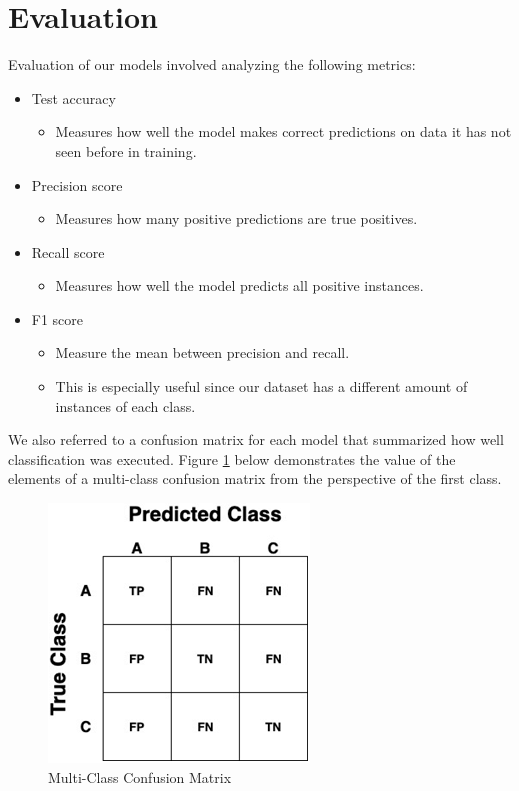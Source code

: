 \graphicspath{ {project_images/} }

\section{Evaluation}
Evaluation of our models involved analyzing the following metrics:

\begin{itemize}
	\item Test accuracy
	\begin{itemize}
		\item Measures how well the model makes correct predictions on data it has not seen before in training.
	\end{itemize}
	\item Precision score
	\begin{itemize}
		\item Measures how many positive predictions are true positives.
	\end{itemize}
	\item Recall score
	\begin{itemize}
		\item Measures how well the model predicts all positive instances.
	\end{itemize}
	\item F1 score
	\begin{itemize}
		\item Measure the mean between precision and recall.
		\item This is especially useful since our dataset has a different amount of instances of each class. 
	\end{itemize}
\end{itemize}

We also referred to a confusion matrix for each model that summarized how well classification was executed. Figure \ref{fig:figure3} below demonstrates the value of the elements of a multi-class confusion matrix from the perspective of the first class.

\begin{figure}[h]
	\centering
	\includegraphics[scale=0.4]{multiclass_cfm}
	\caption{Multi-Class Confusion Matrix}
	\label{fig:figure3}
\end{figure}

